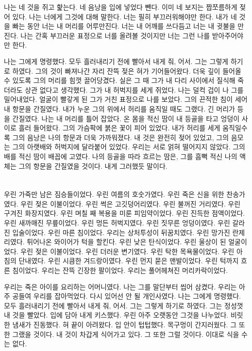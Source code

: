 \documentclass[12pt, b6paper, openany]{memoir}
\newenvironment{article}{}{}
\begin{document}
\begin{article}
나는 네 것을 쥐고 핥는다. 네 음낭을 입에 넣었다 뺀다. 이미 네 보지는 짭쪼름하게 젖어 있다. 나는 너에게 그것에 대해 말한다. 너는 필히 부끄러워해야만 한다. 내가 네 것을 빠는 동안 너는 내 머리를 어루만진다. 너는 내 어깨를 쓰다듬고 너는 내 귓불을 만진다. 나는 간혹 부끄러운 표정으로 너를 올려볼 것이지만 너는 그런 나를 받아주어야만 한다.



나는 그에게 명령했다. 모두 흘러내리기 전에 빨아서 내게 줘, 어서. 그는 그렇게 하기로 하였다. 그의 것이 빠져나간 자리 잔뜩 젖은 혀가 기어들어왔다. 더욱 깊이 들어올 수 있도록 그의 머리를 힘껏 끌어당겼다. 실은 그 때 그가 내 다리 사이에서 질식해 죽더라도 상관 없다고 생각했다. 그가 내 허벅지를 세게 쥐었다. 나는 덜컥 겁이 나 그를 밀어내었다. 얼굴이 빨갛게 된 그가 거친 표정으로 나를 보았다. 그의 끈적한 침이 세어 내 항문을 간질였다. 내가 누운 그의 위에서 허리를 움직일 때도 그랬다. 긴 머리가 등을 간질였다. 나는 내 머리를 틀어 잡았다. 온 몸을 적신 땀이 내 등골을 타고 엉덩이 사이로 흘러 들어왔다. 그의 가슴팍에 붉은 꽃이 피어 있었다. 내가 허리를 세게 움직일수록 그의 음낭은 나의 항문과 더욱 가까워졌다. 내 것은 완전히 젖어 있었고, 그의 음모는 그의 아랫배와 허벅지에 달라붙어 있었다. 우리는 서로 얽혀 떨어지지 않았다. 그의 배를 적신 땀이 배꼽에 고였다. 나의 등골을 따라 흐르는 땀은, 그를 흠뻑 적신 나의 액체는 그의 항문을 간질였을 것이다. 내게 그러했듯 말이다.



\hypertarget{section-1}{%

\section{}\label{section-1}}



우린 가죽만 남은 짐승들이었다. 우린 여름의 호숫가였다. 우린 죽은 신을 위한 찬송가였다. 우린 젖은 이불이었다. 우린 썩은 고깃덩어리였다. 우린 불꺼진 거리였다. 우린 구겨진 화장지였다. 우린 며칠 째 복용을 미룬 피임약이었다. 우린 진득한 점액이었다. 우린 새까매진 무릎이었다. 우린 멍든 허벅지였다. 우린 짓무른 엉덩이였다. 우린 갈라진 입술이었다. 우린 마른 침이었다. 우리는 상처투성이 뒤꿈치였다. 우린 망가진 란제리였다. 튀어나온 와이어가 턱을 할킨다. 우린 낮은 탄식이었다. 우린 울상이 된 얼굴이었다. 우린 젖은 이불이었다. 우린 더러운 변기였다. 우린 탁한 목욕물이었다. 우린 아침의 단내였다. 우린 시큼한 겨드랑이였다. 우린 먼지 묻은 맨발이었다. 우린 턱까지 흐른 침이었다. 우리는 잔뜩 긴장한 팔이었다. 우리는 풀어헤쳐진 머리카락이었다.



우리는 죽은 아이를 요리하는 어머니였다. 나는 그를 말단부터 씹어 삼켰다. 우리는 아주 공들여 우리를 잡아먹었다. 다시 있어선 안 될 개인사였다. 나는 그에게 명령했다. 모두 흘러내리기 전에 빨아서 내게 줘, 어서. 그는 그렇게 하기로 하였다. 그는 정성껏 내 것을 빨았다. 입에 담아 내게 키스했다. 우린 아주 오랫동안 그것을 나누었다. 비릿한 냄새가 진동했다. 혀 끝이 아려왔다. 입 안이 텁텁했다. 목구멍이 간지러웠다. 그 또한 그랬을 것이다. 내 것이 차갑게 식어가고 있다. 그 또한 그럴 것이다. 이대로 식을 수는 없다.


\end{article}
\end{document}
